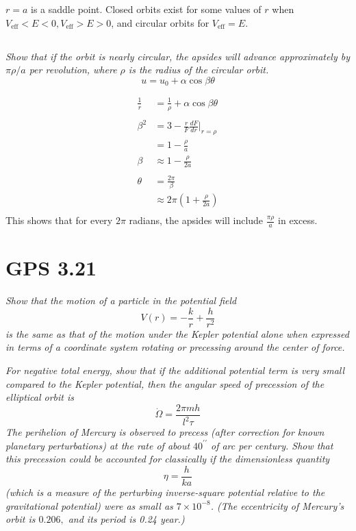 \documentclass{article}
\begin{document}
$r=a$ is a saddle point. Closed orbits exist for some values of $r$ when $V_\mathrm{eff} < E <0, V_\mathrm{eff}>E>0$, and circular orbits for $V_\mathrm{eff} = E$.

\subsection{}
\textit{Show that if the orbit is nearly circular, the apsides will advance approximately by $\pi \rho / a$ per revolution, where $\rho$ is the radius of the circular orbit.}
$$u = u_0 + \alpha \cos \beta \theta$$

\begin{align*}
    \frac{1}{r} &= \frac{1}{\rho} + \alpha \cos \beta \theta\\
    &\\ 
    \beta^2 &= 3 - \frac{r}{F}\frac{d F}{dr}\Big|_{r = \rho}\\
    &= 1 - \frac{\rho}{a}\\
    \beta &\approx 1 - \frac{\rho}{2a}\\
    &\\
    \theta &= \frac{2 \pi}{\beta}\\
    &\approx 2 \pi (1 +  \frac{\rho}{2a})\\
\end{align*}
This shows that for every $2\pi$ radians, the apsides will include $\frac{\pi\rho}{a}$ in excess. 



\newpage


\section{GPS 3.21}
\textit{Show that the motion of a particle in the potential field}
$$
V(r)=-\frac{k}{r}+\frac{h}{r^{2}}
$$
\textit{is the same as that of the motion under the Kepler potential alone when expressed in terms of a coordinate system rotating or precessing around the center of force.}

\textit{For negative total energy, show that if the additional potential term is very small compared to the Kepler potential, then the angular speed of precession of the elliptical orbit is}
$$
\dot{\Omega}=\frac{2 \pi m h}{l^{2} \tau}
$$
\textit{The perihelion of Mercury is observed to precess (after correction for known planetary perturbations) at the rate of about $40^{\prime \prime}$ of arc per century. Show that this precession could be accounted for classically if the dimensionless quantity}
$$
\eta=\frac{h}{k a}
$$
\textit{(which is a measure of the perturbing inverse-square potential relative to the gravitational potential) were as small as $7 \times 10^{-8}$. (The eccentricity of Mercury's orbit is $0.206,$ and its period is 0.24 year.)}
\end{document}
